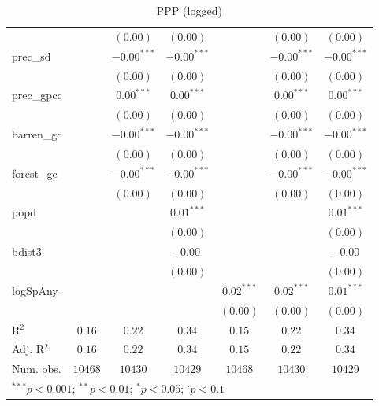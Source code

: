 \begin{sidewaystable}
\begin{center}
{\begin{tabular}{l c c c c c c}
                &               & $(0.00)$      & $(0.00)$        &               & $(0.00)$      & $(0.00)$      \\
prec\_sd        &               & $-0.00^{***}$ & $-0.00^{***}$   &               & $-0.00^{***}$ & $-0.00^{***}$ \\
                &               & $(0.00)$      & $(0.00)$        &               & $(0.00)$      & $(0.00)$      \\
prec\_gpcc      &               & $0.00^{***}$  & $0.00^{***}$    &               & $0.00^{***}$  & $0.00^{***}$  \\
                &               & $(0.00)$      & $(0.00)$        &               & $(0.00)$      & $(0.00)$      \\
barren\_gc      &               & $-0.00^{***}$ & $-0.00^{***}$   &               & $-0.00^{***}$ & $-0.00^{***}$ \\
                &               & $(0.00)$      & $(0.00)$        &               & $(0.00)$      & $(0.00)$      \\
forest\_gc      &               & $-0.00^{***}$ & $-0.00^{***}$   &               & $-0.00^{***}$ & $-0.00^{***}$ \\
                &               & $(0.00)$      & $(0.00)$        &               & $(0.00)$      & $(0.00)$      \\
popd            &               &               & $0.01^{***}$    &               &               & $0.01^{***}$  \\
                &               &               & $(0.00)$        &               &               & $(0.00)$      \\
bdist3          &               &               & $-0.00^{\cdot}$ &               &               & $-0.00$       \\
                &               &               & $(0.00)$        &               &               & $(0.00)$      \\
logSpAny        &               &               &                 & $0.02^{***}$  & $0.02^{***}$  & $0.01^{***}$  \\
                &               &               &                 & $(0.00)$      & $(0.00)$      & $(0.00)$      \\
\hline
R$^2$           & $0.16$        & $0.22$        & $0.34$          & $0.15$        & $0.22$        & $0.34$        \\
Adj. R$^2$      & $0.16$        & $0.22$        & $0.34$          & $0.15$        & $0.22$        & $0.34$        \\
Num. obs.       & $10468$       & $10430$       & $10429$         & $10468$       & $10430$       & $10429$       \\
\hline
\multicolumn{7}{l}{\scriptsize{$^{***}p<0.001$; $^{**}p<0.01$; $^{*}p<0.05$; $^{\cdot}p<0.1$}}
\end{tabular}
}
\caption{PPP
      (logged)}
\label{logPpp}
\end{center}
\end{sidewaystable}

